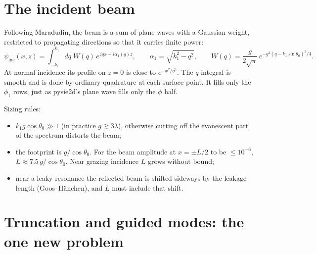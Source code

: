 \documentclass[11pt,a4paper]{article}
\newcommand{\inc}{\mathrm{inc}}
\begin{document}
\section{The incident beam}

Following Maradudin, the beam is a sum of plane waves with a Gaussian weight,
restricted to propagating directions so that it carries finite power:
\begin{equation}
 \psi_\inc(x,z) = \int_{-k_1}^{k_1} dq\; W(q)\, e^{\,i q x - i\alpha_1(q) z},\qquad
 \alpha_1 = \sqrt{k_1^2-q^2},\qquad
 W(q) = \frac{g}{2\sqrt\pi}\,e^{-g^2(q-k_1\sin\theta_0)^2/4}.
\end{equation}
At normal incidence its profile on $z=0$ is close to $e^{-x^2/g^2}$. The
$q$-integral is smooth and is done by ordinary quadrature at each surface point.
It fills only the $\phi_1$ rows, just as pysie2d's plane wave fills only the $\phi$ half.

Sizing rules:
\begin{itemize}
  \item $k_1 g\cos\theta_0 \gg 1$ (in practice $g \gtrsim 3\lambda$), otherwise cutting off
        the evanescent part of the spectrum distorts the beam;
  \item the footprint is $g/\cos\theta_0$. For the beam amplitude at $x=\pm L/2$ to be
        $\le 10^{-6}$, $L \approx 7.5\,g/\cos\theta_0$. Near grazing incidence $L$ grows without bound;
  \item near a leaky resonance the reflected beam is shifted sideways by
        the leakage length (Goos--H\"anchen), and $L$ must include that shift.
\end{itemize}

\section{Truncation and guided modes: the one new problem}
\end{document}
